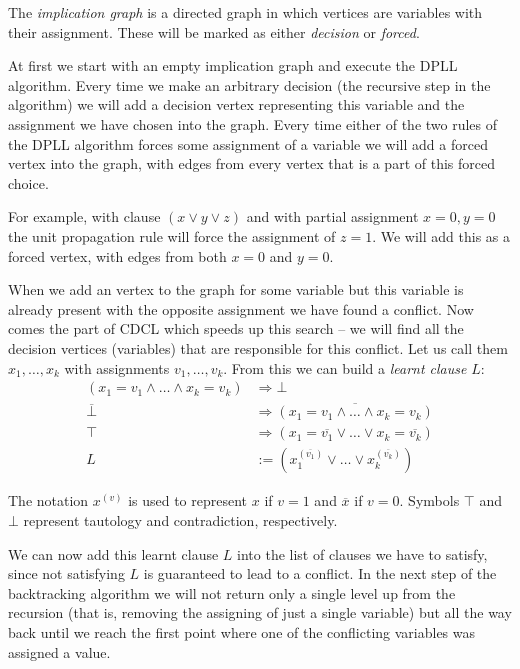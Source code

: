 The \emph{implication graph} is a directed graph in which vertices are variables with their assignment.
These will be marked as either \emph{decision} or \emph{forced}.

At first we start with an empty implication graph and execute the DPLL algorithm.
Every time we make an arbitrary decision (the recursive step in the algorithm) we will add a decision vertex representing this variable and the assignment we have chosen into the graph.
Every time either of the two rules of the DPLL algorithm forces some assignment of a variable we will add a forced vertex into the graph, with edges from every vertex that is a part of this forced choice.

For example, with clause $(x \lor y \lor z)$ and with partial assignment $x=0, y=0$ the unit propagation rule will force the assignment of $z=1$.
We will add this as a forced vertex, with edges from both $x=0$ and $y=0$.

When we add an vertex to the graph for some variable but this variable is already present with the opposite assignment we have found a conflict.
Now comes the part of CDCL which speeds up this search -- we will find all the decision vertices (variables) that are responsible for this conflict.
Let us call them $x_1, \dots, x_k$ with assignments $v_1, \dots, v_k$.
From this we can build a \emph{learnt clause} $L$:
\begin{align*}
(x_1 = v_1 \land \dots \land x_k = v_k) &\Rightarrow \bot \\
\overline{\bot} &\Rightarrow \overline{(x_1 = v_1 \land \dots \land x_k = v_k)} \\
\top &\Rightarrow (x_1 = \overline{v_1} \lor \dots \lor x_k = \overline{v_k}) \\
L &:= (x_1^{(\overline{v_1})} \lor \dots \lor x_k^{(\overline{v_k})})
\end{align*}

The notation $x^{(v)}$ is used to represent $x$ if $v=1$ and $\overline{x}$ if $v=0$. Symbols $\top$ and $\bot$ represent tautology and contradiction, respectively.

We can now add this learnt clause $L$ into the list of clauses we have to satisfy, since not satisfying $L$ is guaranteed to lead to a conflict.
In the next step of the backtracking algorithm we will not return only a single level up from the recursion (that is, removing the assigning of just a single variable) but all the way back until we reach the first point where one of the conflicting variables was assigned a value.

